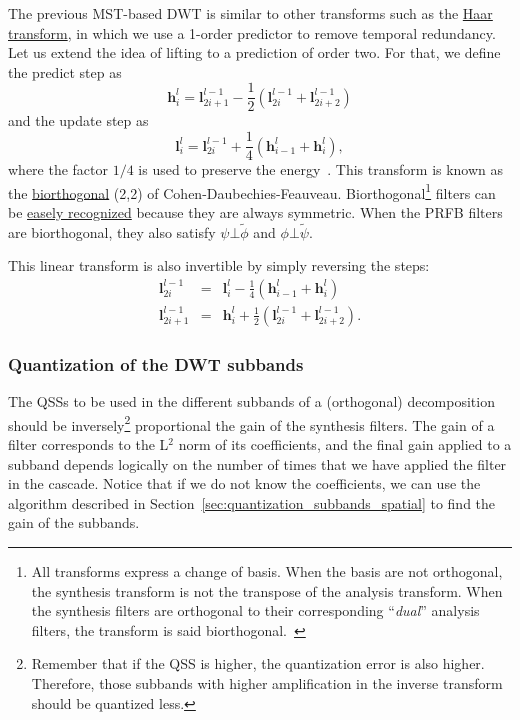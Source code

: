 The previous MST-based DWT is similar to other transforms such as the
\href{https://en.wikipedia.org/wiki/Haar_wavelet}{Haar transform}, in
which we use a 1-order predictor to remove temporal
redundancy. Let us extend the idea of lifting to a prediction of order
two. For that, we define the predict step as
\begin{equation}
  {\mathbf h}^l_i = {\mathbf l}^{l-1}_{2i+1} - \frac{1}{2}({\mathbf l}^{l-1}_{2i} + {\mathbf l}^{l-1}_{2i+2})
\end{equation}
and the update step as
\begin{equation}
  {\mathbf l}^l_i = {\mathbf l}^{l-1}_{2i} + \frac{1}{4}({\mathbf h}^l_{i-1} + {\mathbf h}^l_i),
\end{equation}
where the factor $1/4$ is used to preserve the
energy~\cite{sweldens1997building}. This transform is known as the
\href{https://en.wikipedia.org/wiki/Biorthogonal_wavelet}{biorthogonal}
(2,2) of Cohen-Daubechies-Feauveau.  Biorthogonal\footnote{All
  transforms express a change of basis. When the basis are not
  orthogonal, the synthesis transform is not the transpose of the
  analysis transform. When the synthesis filters are orthogonal to
  their corresponding ``\emph{dual}'' analysis filters, the transform is
  said biorthogonal.~\cite{vetterli2014foundations}} filters can be
\href{http://wavelets.pybytes.com/}{easely recognized} because they
are always symmetric. When the PRFB filters are biorthogonal,
they also satisfy $\psi\bot\tilde\phi$ and
$\phi\bot\tilde\psi$.

This linear transform is also invertible by simply reversing the steps:
\begin{equation}
  \begin{array}{rcl}
    {\mathbf l}^{l-1}_{2i} & = & {\mathbf l}^l_i - \frac{1}{4}({\mathbf h}^l_{i-1} + {\mathbf h}^l_i)\\
    {\mathbf l}^{l-1}_{2i+1} & = & {\mathbf h}^l_i + \frac{1}{2}({\mathbf l}^{l-1}_{2i} + {\mathbf l}^{l-1}_{2i+2}).
  \end{array}
\end{equation}


\subsubsection{Quantization of the DWT subbands}

The QSSs to be used in the different subbands of a (orthogonal)
decomposition should be inversely\footnote{Remember that if the QSS is
  higher, the quantization error is also higher. Therefore, those
  subbands with higher amplification in the inverse transform should
  be quantized less.} proportional the gain of the synthesis
filters. The gain of a filter corresponds to the L$^2$ norm of its
coefficients, and the final gain applied to a subband depends
logically on the number of times that we have applied the filter in
the cascade. Notice that if we do not know the coefficients, we can
use the algorithm described in
Section~\ref{sec:quantization_subbands_spatial} to find the gain of
the subbands.

